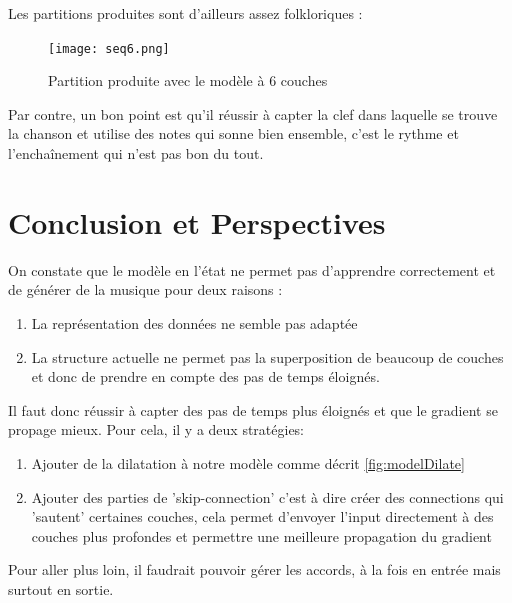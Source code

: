 \documentclass[a4paper]{article}
\begin{document}
Les partitions produites sont d'ailleurs assez folkloriques :

\begin{figure}[ht]
  \caption{Partition produite avec le modèle à 6 couches}
  \texttt{[image: seq6.png]}
  \label{fig:part6}
\end{figure}

Par contre, un bon point est qu'il réussir à capter la clef dans laquelle se trouve la chanson et utilise des notes qui sonne bien ensemble, c'est le rythme et l'enchaînement qui n'est pas bon du tout.

\section{Conclusion et Perspectives}

On constate que le modèle en l'état ne permet pas d'apprendre correctement et de générer de la musique pour deux raisons :
\begin{enumerate}
\item La représentation des données ne semble pas adaptée
\item La structure actuelle ne permet pas la superposition de beaucoup de couches et donc de prendre en compte des pas de temps éloignés.
\end{enumerate}

Il faut donc réussir à capter des pas de temps plus éloignés et que le gradient se propage mieux. Pour cela, il y a deux stratégies:
\begin{enumerate}
\item Ajouter de la dilatation à notre modèle comme décrit \autoref{fig:modelDilate}
\item Ajouter des parties de 'skip-connection' c'est à dire créer des connections qui 'sautent' certaines couches, cela permet d'envoyer l'input directement à des couches plus profondes et permettre une meilleure propagation du gradient
\end{enumerate}

Pour aller plus loin, il faudrait pouvoir gérer les accords, à la fois en entrée mais surtout en sortie.



\end{document}
